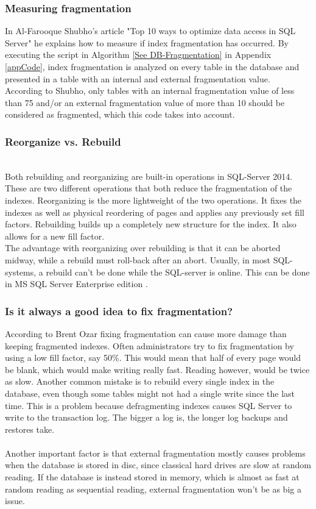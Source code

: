 \documentclass{cslthse-msc}
\begin{document}
\subsubsection{Measuring fragmentation} \label{measurefrag}
In Al-Farooque Shubho's article "Top 10 ways to optimize data access in SQL Server"   \cite{Shubho09} he explains how to measure if index fragmentation has occurred. By executing the script in Algorithm \ref{See DB-Fragmentation} in Appendix \ref{appCode}, index fragmentation is analyzed on every table in the database and presented in a table with an internal and external fragmentation value. \\

According to Shubho, only tables with an internal fragmentation value of less than 75 and/or an external fragmentation value of more than 10 should be considered as fragmented, which this code takes into account.

\subsubsection{Reorganize vs. Rebuild}\mbox{}\\
Both rebuilding and reorganizing are built-in operations in SQL-Server 2014. These are two different operations that both reduce the fragmentation of the indexes. Reorganizing is the more lightweight of the two operations. It fixes the indexes as well as physical reordering of pages and applies any previously set fill factors. Rebuilding builds up a completely new structure for the index. It also allows for a new fill factor.\\
The advantage with reorganizing over rebuilding is that it can be aborted midway, while a rebuild must roll-back after an abort. Usually, in most SQL-systems, a rebuild can't be done while the SQL-server is online. This can be done in MS SQL Server Enterprise edition   \cite{Little13}.

\subsubsection{Is it always a good idea to fix fragmentation?}
According to Brent Ozar   \cite{Ozar12} fixing fragmentation can cause more damage than keeping fragmented indexes. Often administrators try to fix fragmentation by using a low fill factor, say 50\%. This would mean that half of every page would be blank, which would make writing really fast. Reading however, would be twice as slow. Another common mistake is to rebuild every single index in the database, even though some tables might not had a single write since the last time. This is a problem because defragmenting indexes causes SQL Server to write to the transaction log. The bigger a log is, the longer log backups and restores take.\\\\
Another important factor is that external fragmentation mostly causes problems when the database is stored in disc, since classical hard drives are slow at random reading. If the database is instead stored in memory, which is almost as fast at random reading as sequential reading, external fragmentation won't be as big a issue.
\end{document}

